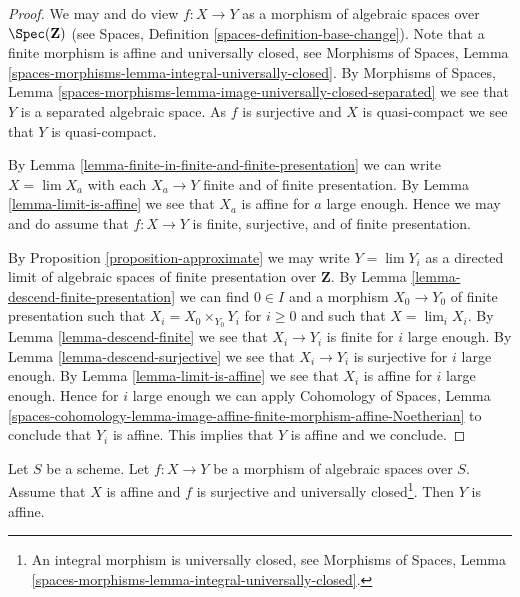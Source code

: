 \begin{proof}
We may and do view $f : X \to Y$ as a morphism of algebraic spaces over
$\Spec(\mathbf{Z})$ (see
Spaces, Definition \ref{spaces-definition-base-change}).
Note that a finite morphism is affine and universally closed, see
Morphisms of Spaces, Lemma
\ref{spaces-morphisms-lemma-integral-universally-closed}.
By Morphisms of Spaces, Lemma
\ref{spaces-morphisms-lemma-image-universally-closed-separated}
we see that $Y$ is a separated algebraic space.
As $f$ is surjective and $X$ is quasi-compact we see that $Y$ is
quasi-compact.

\medskip\noindent
By Lemma \ref{lemma-finite-in-finite-and-finite-presentation}
we can write $X = \lim X_a$ with each $X_a \to Y$ finite and of
finite presentation. By
Lemma \ref{lemma-limit-is-affine}
we see that $X_a$ is affine for $a$ large enough.
Hence we may and do assume that $f : X \to Y$ is finite, surjective, and
of finite presentation.

\medskip\noindent
By Proposition \ref{proposition-approximate} we may write
$Y = \lim Y_i$ as a directed limit of algebraic
spaces of finite presentation over $\mathbf{Z}$.
By Lemma \ref{lemma-descend-finite-presentation} we can
find $0 \in I$ and a morphism $X_0 \to Y_0$ of finite presentation
such that $X_i = X_0 \times_{Y_0} Y_i$ for $i \geq 0$
and such that $X = \lim_i X_i$. By
Lemma \ref{lemma-descend-finite}
we see that $X_i \to Y_i$ is finite for $i$ large enough.
By Lemma \ref{lemma-descend-surjective}
we see that $X_i \to Y_i$ is surjective for $i$ large enough.
By Lemma \ref{lemma-limit-is-affine} we see that $X_i$ is
affine for $i$ large enough. Hence for $i$ large enough we can apply
Cohomology of Spaces, Lemma
\ref{spaces-cohomology-lemma-image-affine-finite-morphism-affine-Noetherian}
to conclude that $Y_i$ is affine. This implies that $Y$ is affine and
we conclude.
\end{proof}

\begin{proposition}
\label{proposition-affine}
Let $S$ be a scheme. Let $f : X \to Y$ be a morphism of algebraic spaces
over $S$. Assume that $X$ is affine and $f$ is surjective and universally
closed\footnote{An integral morphism is universally closed, see
Morphisms of Spaces, Lemma
\ref{spaces-morphisms-lemma-integral-universally-closed}.}. Then $Y$ is affine.
\end{proposition}

